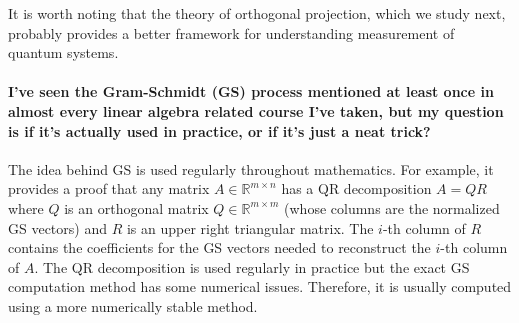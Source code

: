 \documentclass[10pt,english]{article}
\begin{document}
It is worth noting that the theory of orthogonal projection, which we study next, probably provides a better framework for understanding measurement of quantum systems.
 
\paragraph{I've seen the Gram-Schmidt (GS) process mentioned at least once in almost every linear algebra related course I've taken, but my question is if it's actually used in practice, or if it's just a neat trick?}

The idea behind GS is used regularly throughout mathematics.
For example, it provides a proof that any matrix $A \in \mathbb{R}^{m\times n}$ has a QR decomposition $A=QR$ where $Q$ is an orthogonal matrix $Q\in \mathbb{R}^{m\times m}$ (whose columns are the normalized GS vectors) and $R$ is an upper right triangular matrix.
The $i$-th column of $R$ contains the coefficients for the GS vectors needed to reconstruct the $i$-th column of $A$.
The QR decomposition is used regularly in practice but the exact GS computation method has some numerical issues.
Therefore, it is usually computed using a more numerically stable method.
\end{document}
